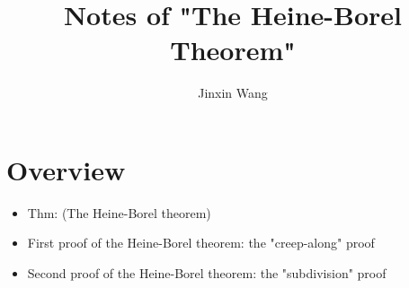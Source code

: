 \documentclass[onecolumn]{ctexart}
\title{Notes of "The Heine-Borel Theorem"}
\author{Jinxin Wang}
\date{}
\begin{document}
\maketitle

\section{Overview}
\begin{itemize}
  \item Thm: (The Heine-Borel theorem)
  \item First proof of the Heine-Borel theorem: the "creep-along" proof
  \item Second proof of the Heine-Borel theorem: the "subdivision" proof
\end{itemize}
\end{document}
